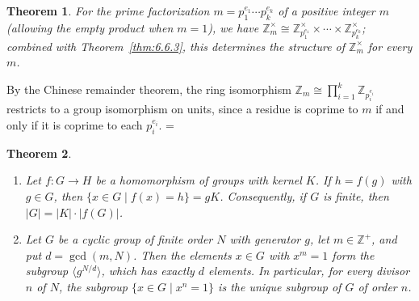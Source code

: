 \documentclass[11pt]{article}
\makeatletter
\let\nt@closedisplay\]
\def\nt@guardedclose{\@ifnextchar\par{\nt@closeafterpar}{\@ifnextchar\end{\postdisplaypenalty\@M\nt@closedisplay}{\nt@closedisplay}}}
\def\nt@closeafterpar\par{\@ifnextchar\par{\nt@closeafterpar}{\@ifnextchar\end{\postdisplaypenalty\@M\nt@closedisplay\par}{\nt@closedisplay\par}}}
\renewenvironment{proof}[1][\proofname]{\par
  \pushQED{\qed}\normalfont\topsep\medskipamount\edef\nt@afterproof{\@endparpenalty=\the\@endparpenalty\relax}\@beginparpenalty\@M\@endparpenalty\@M\let\]\nt@guardedclose\trivlist\item[]\textit{#1\@addpunct{.}} \ignorespaces}{\ifvmode\addpenalty\@M\fi\popQED\nt@afterproof\endtrivlist\@endpefalse}
\theoremstyle{ntstyle}
\newtheorem{theorem}{Theorem}[subsection]
\newcommand{\statementlist}{\mbox{}}
\newcommand{\ZmodUnits}[1]{\mathbb{Z}_{#1}^{\times}}
\makeatother
\begin{document}
\begin{theorem}\label{thm:6.6.4}
  For the prime factorization $m = p_1^{e_1} \cdots p_k^{e_k}$ of a positive integer $m$ (allowing the empty
  product when $m=1$), we have
  $\ZmodUnits{m} \cong \ZmodUnits{p_1^{e_1}} \times \cdots \times \ZmodUnits{p_k^{e_k}}$; combined with
  Theorem~\ref{thm:6.6.3}, this
  determines the structure of $\ZmodUnits{m}$ for every $m$.

\end{theorem}

\begin{proof} By the Chinese remainder theorem, the ring
  isomorphism $\mathbb{Z}_m \cong \prod_{i=1}^{k}\mathbb{Z}_{p_i^{e_i}}$
  restricts to a group isomorphism on units, since a residue is coprime
  to $m$ if and only if it is coprime to each $p_i^{e_i}$.
\end{proof}

\begin{theorem}\label{thm:6.6.5}\statementlist

  \begin{enumerate}[label={\alph*)}]
    \item Let $f:G\to H$ be a homomorphism of groups with kernel $K$. If
          $h=f(g)$ with $g\in G$, then $\{x\in G\mid f(x)=h\}=gK$.
          Consequently, if $G$ is finite, then $|G|=|K|\cdot|f(G)|$.
    \item Let $G$ be a cyclic group of finite order $N$ with generator $g$,
          let $m\in\mathbb{Z}^+$, and put $d=\gcd(m,N)$. Then the elements
          $x\in G$ with $x^m=1$ form the subgroup $\langle g^{N/d}\rangle$,
          which has exactly $d$ elements. In particular, for every divisor $n$
          of $N$, the subgroup $\{x\in G\mid x^n=1\}$ is the unique subgroup of
          $G$ of order $n$.
  \end{enumerate}

\end{theorem}
\end{document}

